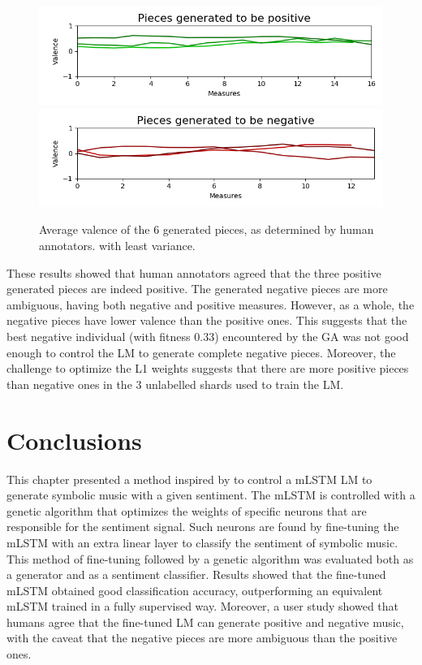 \begin{figure}[!h]
 \includegraphics[width=0.9\columnwidth]{imgs/ismir19/means_pos.png}
 \includegraphics[width=0.9\columnwidth]{imgs/ismir19/means_neg.png}
 \caption{Average valence of the 6 generated pieces, as determined by human annotators.
 with least variance.}
 \label{fig:generated_eval}
\end{figure}

These results showed that human annotators agreed that the three positive generated pieces are indeed positive. The generated negative pieces are more ambiguous, having both negative and positive measures. However, as a whole, the negative pieces have lower valence than the positive ones. This suggests that the best negative individual (with fitness $0.33$) encountered by the GA was not good enough to control the LM to generate complete negative pieces. Moreover, the challenge to optimize the L1 weights suggests that there are more positive pieces than negative ones in the 3 unlabelled shards used to train the LM.

\section{Conclusions}

This chapter presented a method inspired by \citet{radford_2017} to control a mLSTM LM to generate symbolic music with a given sentiment. The mLSTM is controlled with a genetic algorithm that optimizes the weights of specific neurons that are responsible for the sentiment signal. Such neurons are found by fine-tuning the mLSTM with an extra linear layer to classify the sentiment of symbolic music. This method of fine-tuning followed by a genetic algorithm was evaluated both as a generator and as a sentiment classifier. Results showed that the fine-tuned mLSTM obtained good classification accuracy, outperforming an equivalent mLSTM trained in a fully supervised way. Moreover, a user study showed that humans agree that the fine-tuned LM can generate positive and negative music, with the caveat that the negative pieces are more ambiguous than the positive ones.

